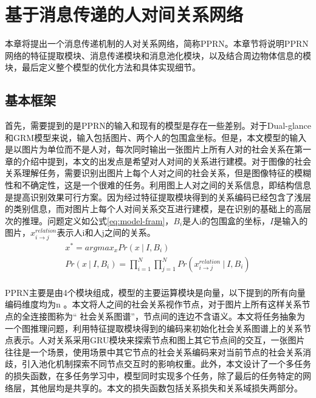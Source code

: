 
\chapter{基于消息传递的人对间关系网络}
\label{ch:model}

本章将提出一个消息传递机制的人对关系网络，简称PPRN。本章节将说明PPRN网络的特征提取模块、消息传递模块和消息池化模块，以及结合周边物体信息的模块，最后定义整个模型的优化方法和具体实现细节。


\section{基本框架}
首先，需要提到的是PPRN的输入和现有的模型是存在一些差别。对于Dual-glance和GRM模型来说，输入包括图片、两个人的包围盒坐标。但是，本文模型的输入是以图片为单位而不是人对，每次同时输出一张图片上所有人对的社会关系在第一章的介绍中提到，本文的出发点是希望对人对间的关系进行建模。对于图像的社会关系理解任务，需要识别出图片上每个人对之间的社会关系，但是图像特征的模糊性和不确定性，这是一个很难的任务。利用图上人对之间的关系信息，即结构信息是提高识别效果可行方案。因为经过特征提取模块得到的关系编码已经包含了浅层的类别信息，而对图片上每个人对间关系交互进行建模，是在识别的基础上的高层次的推理。问题定义如公式\ref{eq:model-fram}，$B_{i}$是人i的包围盒的坐标，$I$是输入的图片，$x_{i \rightarrow j}^{relation}$表示人i和人j之间的关系。
\begin{equation} \label{eq:model-fram}
\begin{split}
    x^{*} = argmax_{x}Pr(x~|~I,B_{i}) \\
    Pr(x~|~I,B_{i}) = \prod_{i=1}^{N}\prod_{j=1}^{N}Pr(x_{i \rightarrow j}^{relation}~|~I,B_{i}) \\
\end{split}
\end{equation}

PPRN主要是由4个模块组成，模型的主要运算模块是向量，以下提到的所有向量编码维度均为n 。本文将人之间的社会关系视作节点，对于图片上所有这样关系节点的全连接图称为`` 社会关系图谱''，节点间的连边不含语义。本文将任务抽象为一个图推理问题，利用特征提取模块得到的编码来初始化社会关系图谱上的关系节点表示。人对关系采用GRU模块来探索节点和图上其它节点间的交互，一张图片往往是一个场景，使用场景中其它节点的社会关系编码来对当前节点的社会关系消歧，引入池化机制探索不同节点交互时的影响权重。此外，本文设计了一个多任务的损失函数，在多任务学习中，模型同时实现多个任务，除了最后的任务特定的网络层，其他层均是共享的。本文的损失函数包括关系损失和关系域损失两部分。

